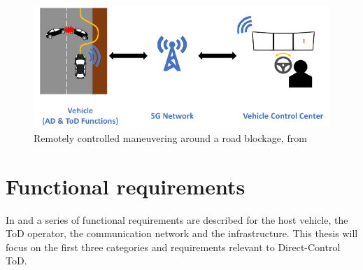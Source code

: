 \begin{figure}[H]
    \centering
    \includegraphics[width=\textwidth]{images/tele_operated_driving/5gcroco_obstacle_avoidance}
    \caption{Remotely controlled maneuvering around a road blockage, from \cite{5gcroco}}
    \label{fig:5gcroco_obstacle_avoidance}
\end{figure}

\section{Functional requirements}
In \cite{5gaa_tod_use_cases_and_requirements} and \cite{5gaa_tod_system_requirements_architecture} a series of functional requirements are described for the host vehicle, the ToD operator, the communication network and the infrastructure. This thesis will focus on the first three categories and requirements relevant to Direct-Control ToD.

